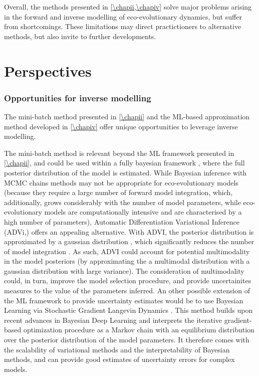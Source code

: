 Overall, the methods presented in \cref{\chapii,\chapiv} solve major problems arising in the forward and inverse modelling of eco-evolutionary dynamics, but suffer from shortcomings. These limitations may direct practictioners to alternative methods, but also invite to further developments.


\section{Perspectives}

\subsubsection{Opportunities for inverse modelling}

The mini-batch method presented in \cref{\chapii} and the ML-based approximation method developed in \cref{\chapiv} offer unique opportunities to leverage inverse modelling.

The mini-batch method is relevant beyond the ML framework presented in \cref{\chapii}, and could be used within a fully bayesian framework \xxx, where the full posterior distribution of the model is estimated.
% 
While Bayesian inference with MCMC chains methods may not be appropriate for eco-evolutionary models (because they require a large number of forward model integration, which, additionally, grows considerably with the number of model parameters, while eco-evolutionary models are computationally intensive and are characterised by a high number of parameters), Automatic Differentiation Variational Inference (ADVi,\xxx) offers an appealing alternative. With ADVI, the posterior distribution is approximated by a gaussian distribution \xxx, which significantly reduces the number of model integration \citep{Gosh2021}. As such, ADVI could account for potential multimodality in the model posteriors (by approximating the a multimodal distribution with a gaussian distribution with large variance). The consideration of multimodality could, in turn, improve the model selection procedure, and provide uncertainites measures to the value of the parameters inferred.
% 
An other possible extension of the ML framework to provide uncertainty estimates would be to use Bayesian Learning via Stochastic Gradient Langevin Dynamics \citep{Welling2011BayesianLV}. This method builds upon recent advances in Bayesian Deep Learning \citep{Wilson2020} and interprets the iterative gradient-based optimization procedure as a Markov chain with an equilibrium distribution over the posterior distribution of the model parameters. It therefore comes with the scalability of variational methods and the interpretability of Bayesian methods, and can provide good estimates of uncertainty errors for complex models.

